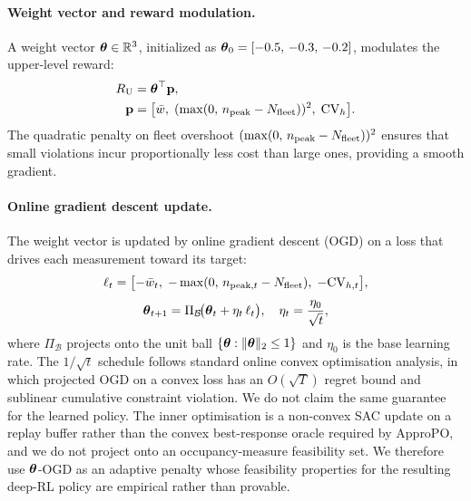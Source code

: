 \paragraph{Weight vector and reward modulation.}
A weight vector $\boldsymbol{\theta} \in \mathbb{R}^3$, initialized as $\boldsymbol{\theta}_0 = [-0.5,\, -0.3,\, -0.2]$, modulates the upper-level reward:
\begin{equation}
\label{eq:upper_reward}
\begin{aligned}
    R_{\mathrm{U}} &= \boldsymbol{\theta}^\top \mathbf{p},\\
    \mathbf{p} &= \bigl[\bar{w},\; (\max(0,\, n_{\mathrm{peak}} - N_{\mathrm{fleet}}))^2,\; \mathrm{CV}_{h}\bigr].
\end{aligned}
\end{equation}
The quadratic penalty on fleet overshoot $(\max(0,\, n_{\mathrm{peak}} - N_{\mathrm{fleet}}))^2$ ensures that small violations incur proportionally less cost than large ones, providing a smooth gradient.

\paragraph{Online gradient descent update.}
The weight vector is updated by online gradient descent (OGD) on a loss that drives each measurement toward its target:
\begin{equation}
\label{eq:ogd_loss}
    \ell_t = \bigl[-\bar{w}_t,\; -\max(0,\, n_{\mathrm{peak},t} - N_{\mathrm{fleet}}),\; -\mathrm{CV}_{h,t}\bigr],
\end{equation}
\begin{equation}
\label{eq:ogd_update}
    \boldsymbol{\theta}_{t+1} = \Pi_{\mathcal{B}}\!\bigl(\boldsymbol{\theta}_t + \eta_t \, \ell_t\bigr), \quad \eta_t = \frac{\eta_0}{\sqrt{t}},
\end{equation}
where $\Pi_{\mathcal{B}}$ projects onto the unit ball $\{\boldsymbol{\theta} : \|\boldsymbol{\theta}\|_2 \leq 1\}$ and $\eta_0$ is the base learning rate.
The $1/\sqrt{t}$ schedule follows standard online convex optimisation analysis, in which projected OGD on a convex loss has an $O(\sqrt{T})$ regret bound and sublinear cumulative constraint violation. We do not claim the same guarantee for the learned policy. The inner optimisation is a non-convex SAC update on a replay buffer rather than the convex best-response oracle required by ApproPO, and we do not project onto an occupancy-measure feasibility set. We therefore use $\boldsymbol{\theta}$-OGD as an adaptive penalty whose feasibility properties for the resulting deep-RL policy are empirical rather than provable.

